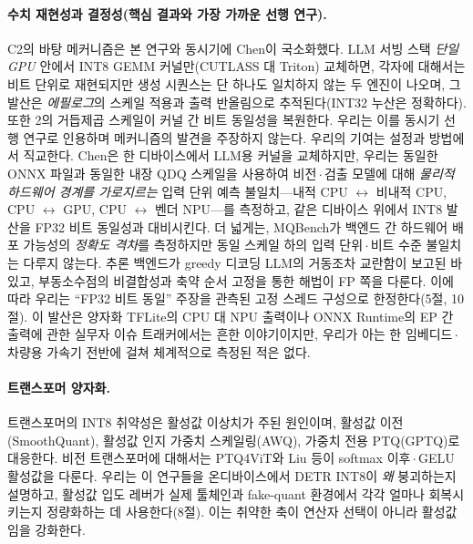\documentclass[11pt]{article}
\begin{document}
\paragraph{수치 재현성과 결정성(핵심 결과와 가장 가까운 선행 연구).}
C2의 바탕 메커니즘은 본 연구와 동시기에 Chen\citep{chen2026integeralibi, chen2026deterministic}이 국소화했다. LLM 서빙 스택 \emph{단일 GPU} 안에서 INT8 GEMM 커널만(CUTLASS 대 Triton) 교체하면, 각자에 대해서는 비트 단위로 재현되지만 생성 시퀀스는 단 하나도 일치하지 않는 두 엔진이 나오며, 그 발산은 \emph{에필로그}의 스케일 적용과 출력 반올림으로 추적된다(INT32 누산은 정확하다). 또한 2의 거듭제곱 스케일이 커널 간 비트 동일성을 복원한다. 우리는 이를 동시기 선행 연구로 인용하며 메커니즘의 발견을 주장하지 않는다. 우리의 기여는 설정과 방법에서 직교한다. Chen은 한 디바이스에서 LLM용 커널을 교체하지만, 우리는 동일한 ONNX 파일과 동일한 내장 QDQ 스케일을 사용하여 비전\,$\cdot$\,검출 모델에 대해 \emph{물리적 하드웨어 경계를 가로지르는} 입력 단위 예측 불일치---내적 CPU $\leftrightarrow$ 비내적 CPU, CPU $\leftrightarrow$ GPU, CPU $\leftrightarrow$ 벤더 NPU---를 측정하고, 같은 디바이스 위에서 INT8 발산을 FP32 비트 동일성과 대비시킨다. 더 넓게는, MQBench\citep{li2021mqbench}가 백엔드 간 하드웨어 배포 가능성의 \emph{정확도 격차}를 측정하지만 동일 스케일 하의 입력 단위\,$\cdot$\,비트 수준 불일치는 다루지 않는다. 추론 백엔드가 greedy 디코딩 LLM의 거동조차 교란함이 보고된 바 있고\citep{masoudian2026}, 부동소수점의 비결합성\citep{fpnonassoc2024}과 축약 순서 고정을 통한 해법\citep{repdl2025}이 FP 쪽을 다룬다. 이에 따라 우리는 ``FP32 비트 동일'' 주장을 관측된 고정 스레드 구성으로 한정한다(5절, 10절). 이 발산은 양자화 TFLite의 CPU 대 NPU 출력이나 ONNX Runtime의 EP 간 출력에 관한 실무자 이슈 트래커에서는 흔한 이야기이지만, 우리가 아는 한 임베디드\,$\cdot$\,차량용 가속기 전반에 걸쳐 체계적으로 측정된 적은 없다.

\paragraph{트랜스포머 양자화.}
트랜스포머의 INT8 취약성은 활성값 이상치가 주된 원인이며\citep{dettmers2022llmint8, bondarenko2021}, 활성값 이전(SmoothQuant\citep{xiao2022smoothquant}), 활성값 인지 가중치 스케일링(AWQ\citep{lin2023awq}), 가중치 전용 PTQ(GPTQ\citep{frantar2022gptq})로 대응한다. 비전 트랜스포머에 대해서는 PTQ4ViT\citep{yuan2022ptq4vit}와 Liu 등\citep{liu2021ptqvit}이 softmax 이후\,$\cdot$\,GELU 활성값을 다룬다. 우리는 이 연구들을 온디바이스에서 DETR INT8이 \emph{왜} 붕괴하는지 설명하고, 활성값 입도 레버가 실제 툴체인과 fake-quant 환경에서 각각 얼마나 회복시키는지 정량화하는 데 사용한다(8절). 이는 취약한 축이 연산자 선택이 아니라 활성값임을 강화한다.
\end{document}
